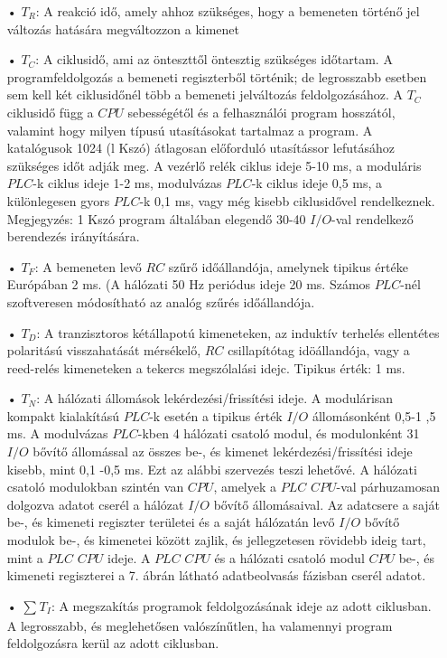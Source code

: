 \documentclass[11pt,a4paper]{article}
\begin{document}
\begin{enumerate}
	\item[•] $T_R$: A reakció idő, amely ahhoz szükséges, hogy a bemeneten történő jel változás hatására megváltozzon a kimenet
	\item[•] $T_C$: A ciklusidő, ami az önteszttől öntesztig szükséges időtartam. A programfeldolgozás a bemeneti regiszterből történik; de legrosszabb esetben sem kell két ciklusidőnél több a bemeneti jelváltozás feldolgozásához.
A $T_C$ ciklusidő függ a $CPU$ sebességétől és a felhasználói program hosszától, valamint hogy milyen típusú utasításokat tartalmaz a program. A katalógusok 1024 (l Kszó) átlagosan előforduló utasítássor lefutásához szükséges időt adják meg. A vezérlő relék ciklus ideje 5-10 ms, a moduláris $PLC$-k ciklus ideje 1-2 ms, modulvázas $PLC$-k ciklus ideje 0,5 ms, a különlegesen gyors $PLC$-k 0,1 ms, vagy még kisebb ciklusidővel rendelkeznek.
Megjegyzés: 1 Kszó program általában elegendő 30-40 $I/O$-val rendelkező berendezés irányítására.
	\item[•] $T_F$: A bemeneten levő $RC$ szűrő időállandója, amelynek tipikus értéke Európában 2 ms. (A hálózati 50 Hz periódus ideje 20 ms. Számos $PLC$-nél szoftveresen módosítható az analóg szűrés időállandója.
	\item[•] $T_D$: A tranzisztoros kétállapotú kimeneteken, az induktív terhelés ellentétes polaritású visszahatását mérsékelő, $RC$ csillapítótag idöállandója, vagy a  reed-relés kimeneteken a tekercs megszólalási idejc. Tipikus érték: 1 ms.
	\item[•] $T_N$: A hálózati állomások lekérdezési/frissítési ideje.
A modulárisan kompakt kialakítású $PLC$-k esetén a tipikus érték $I/O$  állomásonként 0,5-1 ,5 ms.
A modulvázas $PLC$-kben 4 hálózati csatoló modul, és modulonként 31 $I/O$ bővítő állomással az összes be-, és kimenet lekérdezési/frissítési ideje kisebb, mint 0,1 -0,5 ms. Ezt az alábbi szervezés teszi lehetővé.
A hálózati csatoló modulokban szintén van $CPU$, amelyek a $PLC$ $CPU$-val párhuzamosan dolgozva adatot cserél a hálózat $I/O$ bővítő állomásaival. Az adatcsere a saját be-, és kimeneti regiszter területei és a saját hálózatán levő $I/O$ bővítő modulok be-, és kimenetei között zajlik, és jellegzetesen rövidebb ideig tart, mint a $PLC$ $CPU$ ideje. A $PLC$ $CPU$ és a hálózati csatoló modul $CPU$ be-, és kimeneti regiszterei a 7. ábrán látható adatbeolvasás fázisban cserél adatot.
	\item[•] $\sum_{}^{}T_I$: A megszakítás programok feldolgozásának ideje az adott ciklusban. A legrosszabb, és meglehetősen valószínűtlen, ha valamennyi program feldolgozásra kerül az adott ciklusban.
\end{enumerate}
\end{document}
